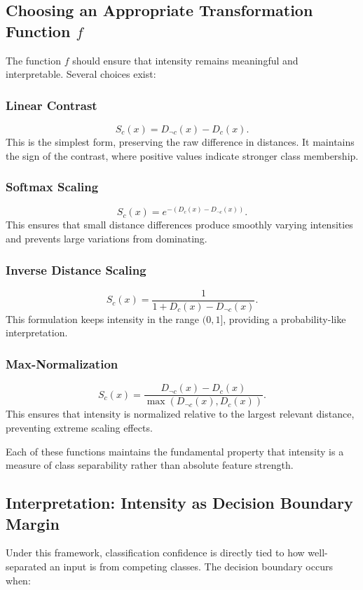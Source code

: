 \subsection{Choosing an Appropriate Transformation Function \( f \)}

The function \( f \) should ensure that intensity remains meaningful and interpretable. Several choices exist:

\subsubsection{Linear Contrast}
\[
S_c(x) = D_{\neg c}(x) - D_c(x).
\]
This is the simplest form, preserving the raw difference in distances. It maintains the sign of the contrast, where positive values indicate stronger class membership.

\subsubsection{Softmax Scaling}
\[
S_c(x) = e^{-(D_c(x) - D_{\neg c}(x))}.
\]
This ensures that small distance differences produce smoothly varying intensities and prevents large variations from dominating.

\subsubsection{Inverse Distance Scaling}
\[
S_c(x) = \frac{1}{1 + D_c(x) - D_{\neg c}(x)}.
\]
This formulation keeps intensity in the range \( (0,1] \), providing a probability-like interpretation.

\subsubsection{Max-Normalization}
\[
S_c(x) = \frac{D_{\neg c}(x) - D_c(x)}{\max(D_{\neg c}(x), D_c(x))}.
\]
This ensures that intensity is normalized relative to the largest relevant distance, preventing extreme scaling effects.

Each of these functions maintains the fundamental property that intensity is a measure of class separability rather than absolute feature strength.

\subsection{Interpretation: Intensity as Decision Boundary Margin}

Under this framework, classification confidence is directly tied to how well-separated an input is from competing classes. The decision boundary occurs when:


